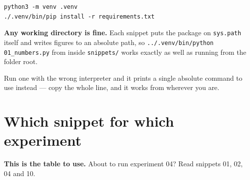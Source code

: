 \begin{lstlisting}[style=out]
python3 -m venv .venv
./.venv/bin/pip install -r requirements.txt
\end{lstlisting}

\textbf{Any working directory is fine.} Each snippet puts the package on \texttt{sys.\discretionary{}{}{}path} itself and writes figures to an absolute path, so \texttt{.\discretionary{}{}{}.\discretionary{}{}{}/\discretionary{}{}{}.\discretionary{}{}{}venv/\discretionary{}{}{}bin/\discretionary{}{}{}python 01\_\discretionary{}{}{}numbers.\discretionary{}{}{}py} from inside \texttt{snippets/\discretionary{}{}{}} works exactly as well as running from the folder root.

Run one with the wrong interpreter and it prints a single absolute command to use instead --- copy the whole line, and it works from wherever you are.

\section{Which snippet for which experiment}

\textbf{This is the table to use.} About to run experiment 04? Read snippets 01, 02, 04 and 10.

